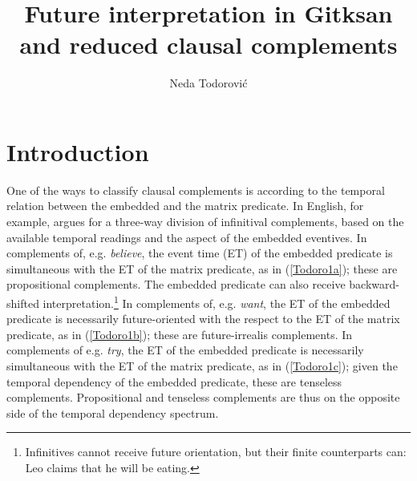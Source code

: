 \documentclass[output=paper]{langscibook}
\author{Neda Todorović\affiliation{University of British Columbia}}
\title{Future interpretation in Gitksan and reduced clausal complements}
\begin{document}
\newcommand{\tsc}{\textsc}
\newcommand{\CP}{\textsc{cp}}
\newcommand{\tp}{\textsc{tp}}
\newcommand{\aspp}{\textsc{aspp}}
\newcommand{\vp}{\textsc{vp}}
\newcommand{\MOD}{\textsc{mod}}
\newcommand{\woll}{\textsc{woll}}
\newcommand{\dn}{\textsc{dn}}
\newcommand{\cn}{\textsc{cn}}
\newcommand{\pn}{\textsc{pn}}
\newcommand{\seriesI}{\textsc{i}}
\newcommand{\seriesII}{\textsc{ii}}
\newcommand{\seriesIII}{\textsc{iii}}
\newcommand{\irr}{\textsc{irr}}
\newcommand{\glossNeg}{\textsc{neg}}
\newcommand{\foc}{\textsc{foc}}
\newcommand{\prog}{\textsc{prog}}
\newcommand{\sg}{\textsc{sg}}
\newcommand{\tr}{\textsc{tr}}
\newcommand{\sx}{\textsc{sx}}
\newcommand{\ax}{\textsc{ax}}
\newcommand{\pl}{\textsc{pl}}
\newcommand{\indp}{\textsc{indp}}
\newcommand{\comp}{\textsc{comp}}
\newcommand{\pass}{\textsc{pass}}
\maketitle

\section{Introduction}\label{Todoro:sect1}\largerpage[-1]
One of the ways to classify clausal complements is according to the temporal relation between the embedded and the matrix predicate. 
In English, for example, \citet{wurmbrand2014a} argues for a three-way division of  infinitival complements, based on the available temporal readings and the aspect of the embedded eventives. In complements of, e.g. \emph{believe}, the event time (ET) of the embedded predicate is simultaneous with the ET of the matrix predicate, as in (\ref{Todoro1a}); these are propositional complements. The embedded predicate can also receive backward-shifted interpretation.\footnote{Infinitives cannot receive future orientation, but their finite counterparts can: \ea Leo claims that he will be eating.\z} In complements of, e.g. \emph{want}, the ET of the embedded predicate is necessarily future-oriented with the respect to the ET of the matrix predicate, as in (\ref{Todoro1b}); these are future-irrealis complements. In complements of e.g. \emph{try}, the ET of the embedded predicate is necessarily simultaneous with the ET of the matrix predicate, as in (\ref{Todoro1c}); given the temporal dependency of the embedded predicate, these are tenseless complements. Propositional and tenseless complements are thus on the opposite side of the temporal dependency spectrum. 
\end{document}
